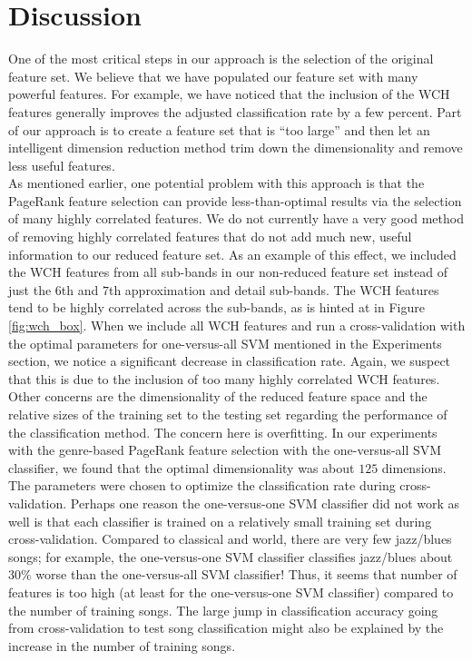 \documentclass[12pt]{article}
\begin{document}
\section{Discussion}

One of the most critical steps in our approach is the selection of the original feature set.  We believe that we have populated our feature set with many powerful features.  For example, we have noticed that the inclusion of the WCH features generally improves the adjusted classification rate by a few percent.  Part of our approach is to create a feature set that is ``too large'' and then let an intelligent dimension reduction method trim down the dimensionality and remove less useful features.\\

As mentioned earlier, one potential problem with this approach is that the PageRank feature selection can provide less-than-optimal results via the selection of many highly correlated features.  We do not currently have a very good method of removing highly correlated features that do not add much new, useful information to our reduced feature set.  As an example of this effect, we included the WCH features from all sub-bands in our non-reduced feature set instead of just the $6$th and $7$th approximation and detail sub-bands.  The WCH features tend to be highly correlated across the sub-bands, as is hinted at in Figure \ref{fig:wch_box}.  When we include all WCH features and run a cross-validation with the optimal parameters for one-versus-all SVM mentioned in the Experiments section, we notice a significant decrease in classification rate.  Again, we suspect that this is due to the inclusion of too many highly correlated WCH features.\\

Other concerns are the dimensionality of the reduced feature space and the relative sizes of the training set to the testing set regarding the performance of the classification method.  The concern here is overfitting.  In our experiments with the genre-based PageRank feature selection with the one-versus-all SVM classifier, we found that the optimal dimensionality was about $125$ dimensions.  The parameters were chosen to optimize the classification rate during cross-validation.  Perhaps one reason the one-versus-one SVM classifier did not work as well is that each classifier is trained on a relatively small training set during cross-validation.  Compared to classical and world, there are very few jazz/blues songs; for example, the one-versus-one SVM classifier classifies jazz/blues about $30\%$ worse than the one-versus-all SVM classifier!  Thus, it seems that number of features is too high (at least for the one-versus-one SVM classifier) compared to the number of training songs.  The large jump in classification accuracy going from cross-validation to test song classification might also be explained by the increase in the number of training songs.\\
\end{document}
